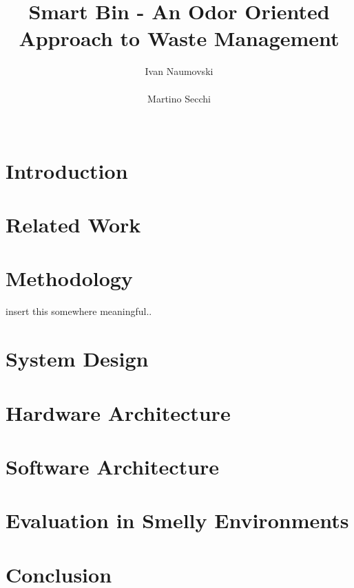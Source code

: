 \documentclass{sigchi}
\begin{document}
\title{Smart Bin - An Odor Oriented Approach to Waste Management}

\author{
  \alignauthor Ivan Naumovski\\
    \\
  \alignauthor Martino Secchi\\
    \\
}

\maketitle

\begin{abstract}

\end{abstract}






\section{Introduction}


\section{Related Work}


\section{Methodology}
insert this somewhere meaningful..

\section{System Design}


\section{Hardware Architecture}


\section{Software Architecture}


\section{Evaluation in Smelly Environments}


\section{Conclusion}




\end{document}

